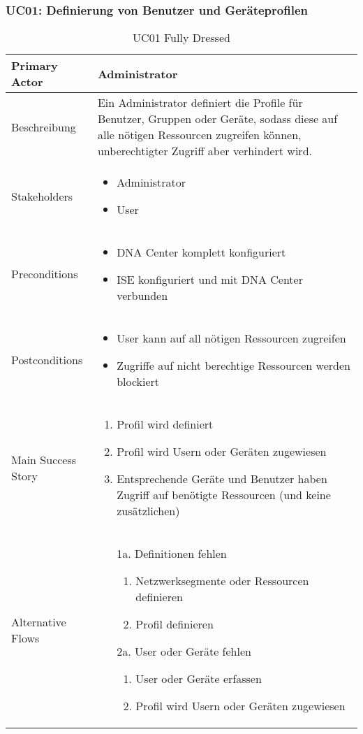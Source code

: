\subsubsection{UC01: Definierung von Benutzer und Geräteprofilen}
\begin{table}[H]
	\centering
	\begin{tabularx}{\textwidth}{l | X}
		Primary Actor      & Administrator        \\
		\hline
		Beschreibung       & Ein Administrator definiert die Profile für Benutzer, Gruppen oder Geräte, sodass diese auf alle nötigen Ressourcen zugreifen können, unberechtigter Zugriff aber verhindert wird. \\ 
		\hline
		Stakeholders       &  
		\begin{itemize}	
			\item Administrator
			\item User
		\end{itemize}              \\
		\hline
		Preconditions      & 
		\begin{itemize}	
			\item DNA Center komplett konfiguriert
			\item ISE konfiguriert und mit DNA Center verbunden
		\end{itemize}  \\
		\hline
		Postconditions     & 
		\begin{itemize}	
			\item User kann auf all nötigen Ressourcen zugreifen
			\item Zugriffe auf nicht berechtige Ressourcen werden blockiert
		\end{itemize}  \\
		\hline
		Main Success Story & 
		\begin{enumerate}
			\item Profil wird definiert
			\item Profil wird Usern oder Geräten zugewiesen
			\item Entsprechende Geräte und Benutzer haben Zugriff auf benötigte Ressourcen (und keine zusätzlichen)
		\end{enumerate}
		\\
		\hline
		Alternative Flows  & 
		\begin{itemize}
			\item[1a.] Definitionen fehlen
			\begin{enumerate}
				\item Netzwerksegmente oder Ressourcen definieren
				\item Profil definieren
			\end{enumerate}
			\item[2a.] User oder Geräte fehlen
			\begin{enumerate}
				\item User oder Geräte erfassen
				\item Profil wird Usern oder Geräten zugewiesen
			\end{enumerate}
		\end{itemize}
	\end{tabularx}
	\caption{UC01 Fully Dressed}
	\label{tab:UC01}
\end{table}
